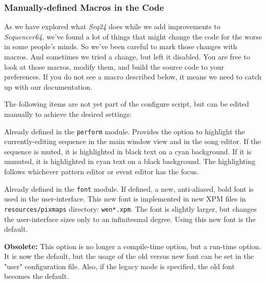 \subsubsection{Manually-defined Macros in the Code}
\label{subsubsec:seq64_build_macros}

   As we have explored what \textsl{Seq24} does while we add improvements to
   \textsl{Sequencer64}, we've found a lot of things that might change the code
   for the worse in some people's minds.  So we've been careful to mark those
   changes with macros.  And sometimes we tried a change, but left it
   disabled.  You are free to look at those macros, modify them, and build
   the source code to your preferences.  If you do not see a macro described
   below, it means we need to catch up with our documentation.

   The following items are not yet part of the configure script, but can
   be edited manually to achieve the desired settings:

   \setcounter{ItemCounter}{0}      %
   
        Already defined in the \texttt{perform} module.
        Provides the option to highlight the currently-editing sequence in the
        main window view and in the song editor.  If the sequence is muted, it
        is highlighted in black text on a cyan background.  If it is unmuted,
        it is highlighted in cyan text on a black background.  The highlighting
        follows whichever pattern editor or event editor has the focus.

        Already defined in the \texttt{font} module.
        If defined, a new, anti-aliased,
        bold font is used in the user-interface.  This new font is implemented
        in new XPM files in \texttt{resources/pixmaps} directory:
        \texttt{wen*.xpm}.  The font is slightly
        larger, but changes the user-interface sizes only to an infinitesmal
        degree.  Using this new font is the default.

        \textbf{Obsolete:}
        This option is no longer a compile-time option, but a run-time option.
        It is now the default, but the usage of the old versus new font can be
        set in the "user" configuration file.
        Also, if the legacy mode is specified, the old font becomes the
        default.


